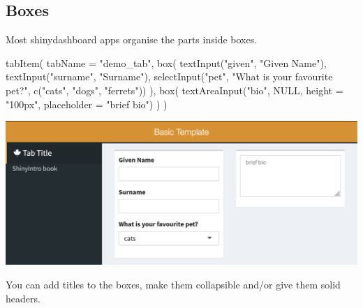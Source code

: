 \documentclass[
]{book}
\newenvironment{Shaded}{\begin{snugshade}}{\end{snugshade}}
\newcommand{\AttributeTok}[1]{\textcolor[rgb]{0.77,0.63,0.00}{#1}}
\newcommand{\ConstantTok}[1]{\textcolor[rgb]{0.00,0.00,0.00}{#1}}
\newcommand{\FunctionTok}[1]{\textcolor[rgb]{0.00,0.00,0.00}{#1}}
\newcommand{\NormalTok}[1]{#1}
\newcommand{\StringTok}[1]{\textcolor[rgb]{0.31,0.60,0.02}{#1}}
\begin{document}
\hypertarget{boxes}{%
\subsection{Boxes}\label{boxes}}

Most shinydashboard apps organise the parts inside boxes.

\begin{Shaded}
\begin{Highlighting}[]
\FunctionTok{tabItem}\NormalTok{(}
    \AttributeTok{tabName =} \StringTok{"demo\_tab"}\NormalTok{,}
    \FunctionTok{box}\NormalTok{(}
      \FunctionTok{textInput}\NormalTok{(}\StringTok{"given"}\NormalTok{, }\StringTok{"Given Name"}\NormalTok{),}
      \FunctionTok{textInput}\NormalTok{(}\StringTok{"surname"}\NormalTok{, }\StringTok{"Surname"}\NormalTok{),}
      \FunctionTok{selectInput}\NormalTok{(}\StringTok{"pet"}\NormalTok{, }\StringTok{"What is your favourite pet?"}\NormalTok{, }\FunctionTok{c}\NormalTok{(}\StringTok{"cats"}\NormalTok{, }\StringTok{"dogs"}\NormalTok{, }\StringTok{"ferrets"}\NormalTok{))}
\NormalTok{    ),}
    \FunctionTok{box}\NormalTok{(}
       \FunctionTok{textAreaInput}\NormalTok{(}\StringTok{"bio"}\NormalTok{, }\ConstantTok{NULL}\NormalTok{, }\AttributeTok{height =} \StringTok{"100px"}\NormalTok{, }\AttributeTok{placeholder =} \StringTok{"brief bio"}\NormalTok{)}
\NormalTok{    )}
\NormalTok{)}
\end{Highlighting}
\end{Shaded}

\includegraphics{images/sdb_layout2.png}

You can add titles to the boxes, make them collapsible and/or give them solid headers.
\end{document}
